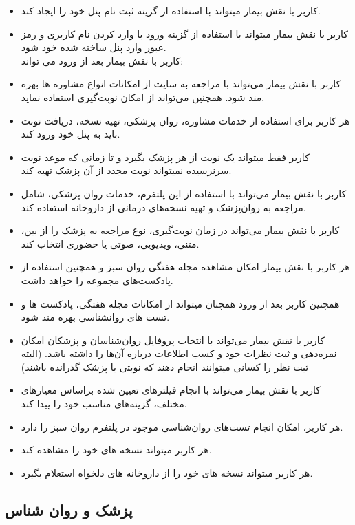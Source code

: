 \documentclass[a4paper]{article}
\begin{document}
		\begin{itemize}
			
		\item کاربر با نقش بیمار میتواند با استفاده از گزینه ثبت نام پنل خود را ایجاد کند.
		\item کاربر با نقش بیمار میتواند با استفاده از گزینه ورود با وارد کردن نام کاربری و رمز عبور وارد پنل ساخته شده خود شود.
		\\
		کاربر با نقش بیمار بعد از ورود می تواند:
		\item کاربر با نقش بیمار می‌تواند با مراجعه به سایت از امکانات انواع مشاوره ها بهره مند شود. همچنین می‌تواند از امکان نوبت‌گیری استفاده نماید.
		\item هر کاربر برای استفاده از خدمات مشاوره، روان پزشکی، تهیه نسخه، دریافت نوبت باید به پنل خود ورود کند.
		\item کاربر فقط میتواند یک نوبت از هر پزشک بگیرد و تا زمانی که موعد نوبت سرنرسیده نمیتواند نوبت مجدد از آن پزشک تهیه کند.
		\item کاربر با نقش بیمار می‌تواند با استفاده از این پلتفرم، خدمات روان پزشکی، شامل مراجعه به روان‌پزشک و تهیه نسخه‌های درمانی از داروخانه استفاده کند.
		\item کاربر با نقش بیمار می‌تواند در زمان نوبت‌گیری، نوع مراجعه به پزشک را از بین، متنی، ویدیویی، صوتی یا حضوری انتخاب کند.
		\item هر کاربر با نقش بیمار امکان مشاهده مجله هفتگی روان سبز و همچنین استفاده از پادکست‌های مجموعه را خواهد داشت.
		\item همچنین کاربر بعد از ورود همچنان میتواند از امکانات مجله هفتگی، پادکست ها و تست های روانشناسی بهره مند شود.
		\item کاربر با نقش بیمار می‌تواند با انتخاب پروفایل روان‌شناسان و پزشکان امکان نمره‌دهی و ثبت نظرات خود و کسب اطلاعات درباره آن‌ها را داشته باشد. (البته ثبت نظر را کسانی میتوانند انجام دهند که نوبتی با پزشک گذرانده باشند)
		\item کاربر با نقش بیمار می‌تواند با انجام فیلترهای تعیین شده براساس معیارهای مختلف، گزینه‌های مناسب خود را پیدا کند.
		\item هر کاربر، امکان انجام تست‌های روان‌شناسی موجود در پلتفرم روان سبز را دارد.
		\item هر کاربر میتواند نسخه های خود را مشاهده کند.
		\item هر کاربر میتواند نسخه های خود را از داروخانه های دلخواه استعلام بگیرد.
		
		\end{itemize}
		
		\subsection{پزشک و روان شناس}
		
\end{document}
